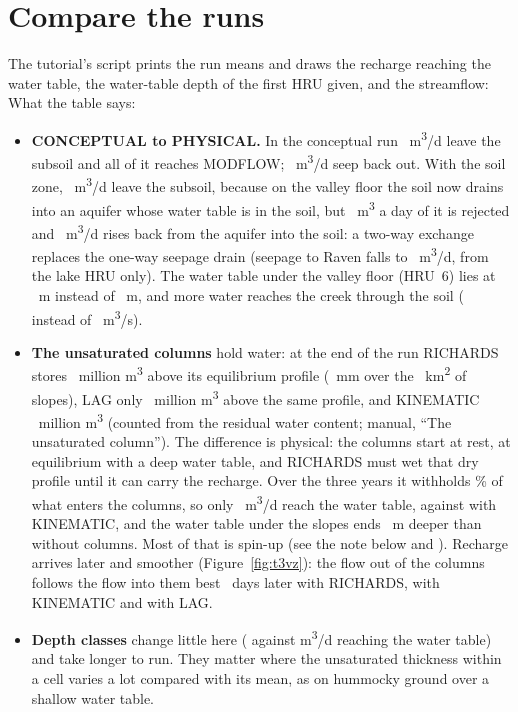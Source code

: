 \section{Compare the runs}
The tutorial's script  prints the run means and draws the recharge reaching the water table, the
water-table depth of the first HRU given, and the streamflow:
What the table says:
\begin{itemize}
\item \textbf{CONCEPTUAL to PHYSICAL.} In the conceptual run ~m\textsuperscript{3}/d leave the
  subsoil and all of it reaches MODFLOW; ~m\textsuperscript{3}/d seep back out. With the soil zone,
  ~m\textsuperscript{3}/d leave the subsoil, because on the valley floor the soil now drains into an
  aquifer whose water table is in the soil, but ~m\textsuperscript{3} a day of it is rejected and
  ~m\textsuperscript{3}/d rises back from the aquifer into the soil: a two-way exchange replaces the
  one-way seepage drain (seepage to Raven falls to ~m\textsuperscript{3}/d, from the lake HRU only). The
  water table under the valley floor (HRU~6) lies at ~m instead of ~m, and more
  water reaches the creek through the soil ( instead of ~m\textsuperscript{3}/s).
\item \textbf{The unsaturated columns} hold water: at the end of the run RICHARDS stores ~million
  m\textsuperscript{3} above its equilibrium profile (~mm over the ~km\textsuperscript{2} of
  slopes), LAG only ~million m\textsuperscript{3} above the same profile, and KINEMATIC
  ~million m\textsuperscript{3} (counted from the residual water content; manual, ``The unsaturated
  column''). The difference is physical: the columns start at rest, at equilibrium with a deep water table, and RICHARDS
  must wet that dry profile until it can carry the recharge. Over the three years it withholds \% of what
  enters the columns, so only ~m\textsuperscript{3}/d reach the water table, against
   with KINEMATIC, and the water table under the slopes ends ~m deeper than without
  columns. Most of that is spin-up (see the note below and ). Recharge arrives later and smoother (Figure~\ref{fig:t3vz}): the flow out of
  the columns follows the flow into them best ~days later with RICHARDS,  with
  KINEMATIC and  with LAG.
\item \textbf{Depth classes} change little here ( against 
  m\textsuperscript{3}/d reaching the water table) and take longer to run. They matter where the unsaturated thickness
  within a cell varies a lot compared with its mean, as on hummocky ground over a shallow water table.
\end{itemize}
